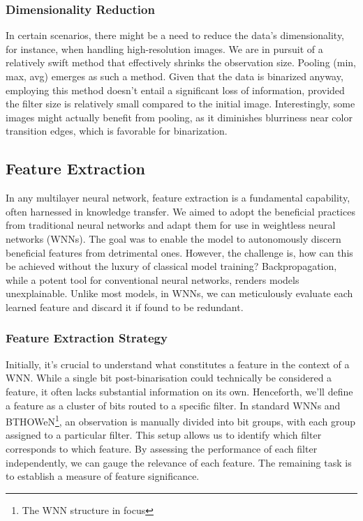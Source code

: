 \documentclass{article}[12pt]
\begin{document}
\subsubsection*{Dimensionality Reduction}
In certain scenarios, there might be a need to reduce the data's dimensionality, for instance, when handling high-resolution images.
We are in pursuit of a relatively swift method that effectively shrinks the observation size.
Pooling (min, max, avg) emerges as such a method.
Given that the data is binarized anyway, employing this method doesn't entail a significant loss of information, provided the filter size is relatively small compared to the initial image.
Interestingly, some images might actually benefit from pooling, as it diminishes blurriness near color transition edges, which is favorable for binarization.

\subsection{Feature Extraction}\label{subsec:feature-extraction}

In any multilayer neural network, feature extraction is a fundamental capability, often harnessed in knowledge transfer.
We aimed to adopt the beneficial practices from traditional neural networks and adapt them for use in weightless neural networks (WNNs).
The goal was to enable the model to autonomously discern beneficial features from detrimental ones.
However, the challenge is, how can this be achieved without the luxury of classical model training?
Backpropagation, while a potent tool for conventional neural networks, renders models unexplainable.
Unlike most models, in WNNs, we can meticulously evaluate each learned feature and discard it if found to be redundant.

\subsubsection*{Feature Extraction Strategy}
Initially, it's crucial to understand what constitutes a feature in the context of a WNN\@.
While a single bit post-binarisation could technically be considered a feature, it often lacks substantial information on its own.
Henceforth, we'll define a feature as a cluster of bits routed to a specific filter.
In standard WNNs and BTHOWeN\footnote{The WNN structure in focus}, an observation is manually divided into bit groups, with each group assigned to a particular filter.
This setup allows us to identify which filter corresponds to which feature.
By assessing the performance of each filter independently, we can gauge the relevance of each feature.
The remaining task is to establish a measure of feature significance.
\end{document}
